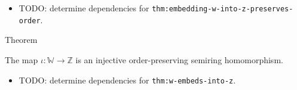 \begin{dependencies}
\begin{itemize}
  \item TODO: determine dependencies for \texttt{thm:embedding-w-into-z-preserves-order}.
\end{itemize}
\end{dependencies}

\begin{theorembox}{Theorem}
\begin{theorem}
\label{thm:w-embeds-into-z}
The map $\iota:\mathbb{W}\to\mathbb{Z}$ is an injective order-preserving
semiring homomorphism.
\end{theorem}
\end{theorembox}

\begin{dependencies}
\begin{itemize}
  \item TODO: determine dependencies for \texttt{thm:w-embeds-into-z}.
\end{itemize}
\end{dependencies}
